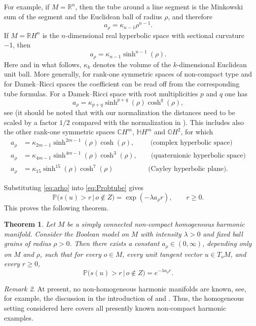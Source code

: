 \documentclass[11pt,a4paper]{article}
\theoremstyle{plain}
\newtheorem{theorem}{Theorem}
\theoremstyle{definition}
\theoremstyle{remark}
\newtheorem{remark}[theorem]{Remark}
\def\CC{\mathbb{C}}
\def\HH{\mathbb{H}}
\def\OO{\mathbb{O}}
\def\PP{\mathbb{P}}
\def\RR{\mathbb{R}}
\begin{document}
For example, if \(M=\RR^n\), then the tube around a line segment is the
Minkowski sum of the segment and the Euclidean ball of radius \(\rho\), and
therefore
\[
a_\rho=\kappa_{n-1}\rho^{n-1}.
\]
If \(M=\RR H^n\) is the \(n\)-dimensional real hyperbolic space with sectional
curvature \(-1\), then
\[
a_\rho=\kappa_{n-1}\sinh^{n-1}(\rho).
\]
Here and in what follows, \(\kappa_k\) denotes the volume of the
\(k\)-dimensional Euclidean unit ball.
{More generally, for rank-one symmetric spaces of non-compact type and for
Damek--Ricci spaces the coefficient can be read off from the corresponding
tube formulas. For a Damek--Ricci space with root multiplicities \(p\) and \(q\) one has
\[
a_\rho
=
\kappa_{p+q}\sinh^{p+q}(\rho)\cosh^q(\rho),
\]
see \cite[Theorem 4.1]{CsikosHorvathTubes} (it should be noted that with our normalization the distances need to be scaled by a factor \(1/2\) compared with the normalization in \cite{CsikosHorvathTubes}). 
This includes also the other rank-one symmetric spaces \(\CC H^m\), \(\HH H^m\) and
\(\OO H^2\), for which
\begin{align*}
a_\rho
&=
\kappa_{2m-1}\sinh^{2m-1}(\rho)\cosh(\rho),\qquad\,\,\text{(complex hyperbolic space)}\\
a_\rho
&=
\kappa_{4m-1}\sinh^{4m-1}(\rho)\cosh^3(\rho),\qquad\text{(quaternionic hyperbolic space)}\\
a_\rho
&=
\kappa_{15}\sinh^{15}(\rho)\cosh^7(\rho)\qquad\quad\qquad \text{(Cayley hyperbolic plane)}.
\end{align*}}


Substituting \eqref{eq:arho} into \eqref{eq:Probtube} gives
\[
\PP\bigl(s(u)>r\,\big|\,o\notin Z\bigr)
=
\exp(-\lambda a_\rho r),
\qquad r\geq 0.
\]
This proves the following theorem.

\begin{theorem}\label{thm:exp_visibility_harmonic}
	Let \(M\) be a simply connected non-compact homogeneous harmonic manifold.
	Consider the Boolean model on \(M\) with intensity \(\lambda>0\) and fixed
	ball grains of radius \(\rho>0\). Then there exists a constant
	\(a_\rho\in(0,\infty)\), depending only on \(M\) and \(\rho\), such that
	for every \(o\in M\), every unit tangent vector \(u\in T_oM\), and every
	\(r\geq 0\),
	\[
	\PP\bigl(s(u)>r\,\big|\,o\notin Z\bigr)
	=
	e^{-\lambda a_\rho r}.
	\]
\end{theorem}

\begin{remark}\label{rem:no_nonhomogeneous_known}
	At present, no non-homogeneous harmonic manifolds are known, see, for
	example, the discussion in the introduction of
	\cite{CsikosHorvathHarmonicTubes} and \cite[p.\ 100]{GrayBook}. Thus, the homogeneous setting considered
	here covers all presently known non-compact harmonic examples.
\end{remark}
\end{document}
